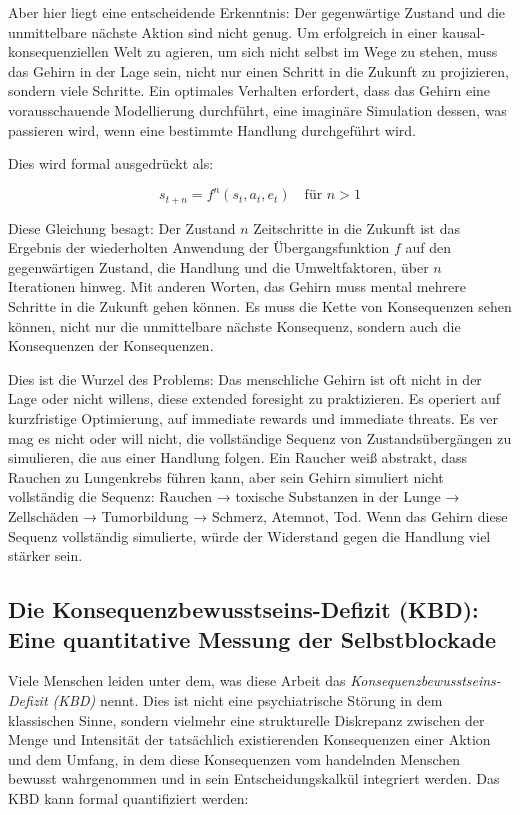 \documentclass[12pt,a4paper]{article}
\begin{document}
Aber hier liegt eine entscheidende Erkenntnis: Der gegenwärtige Zustand und die unmittelbare nächste Aktion sind nicht genug. Um erfolgreich in einer kausal-konsequenziellen Welt zu agieren, um sich nicht selbst im Wege zu stehen, muss das Gehirn in der Lage sein, nicht nur einen Schritt in die Zukunft zu projizieren, sondern viele Schritte. Ein optimales Verhalten erfordert, dass das Gehirn eine vorausschauende Modellierung durchführt, eine imaginäre Simulation dessen, was passieren wird, wenn eine bestimmte Handlung durchgeführt wird.

Dies wird formal ausgedrückt als:

\begin{equation}
s_{t+n} = f^n(s_t, a_t, e_t) \quad \text{für } n > 1
\end{equation}

Diese Gleichung besagt: Der Zustand $n$ Zeitschritte in die Zukunft ist das Ergebnis der wiederholten Anwendung der Übergangsfunktion $f$ auf den gegenwärtigen Zustand, die Handlung und die Umweltfaktoren, über $n$ Iterationen hinweg. Mit anderen Worten, das Gehirn muss mental mehrere Schritte in die Zukunft gehen können. Es muss die Kette von Konsequenzen sehen können, nicht nur die unmittelbare nächste Konsequenz, sondern auch die Konsequenzen der Konsequenzen.

Dies ist die Wurzel des Problems: Das menschliche Gehirn ist oft nicht in der Lage oder nicht willens, diese extended foresight zu praktizieren. Es operiert auf kurzfristige Optimierung, auf immediate rewards und immediate threats. Es ver mag es nicht oder will nicht, die vollständige Sequenz von Zustandsübergängen zu simulieren, die aus einer Handlung folgen. Ein Raucher weiß abstrakt, dass Rauchen zu Lungenkrebs führen kann, aber sein Gehirn simuliert nicht vollständig die Sequenz: Rauchen → toxische Substanzen in der Lunge → Zellschäden → Tumorbildung → Schmerz, Atemnot, Tod. Wenn das Gehirn diese Sequenz vollständig simulierte, würde der Widerstand gegen die Handlung viel stärker sein.

\subsection{Die Konsequenzbewusstseins-Defizit (KBD): Eine quantitative Messung der Selbstblockade}

Viele Menschen leiden unter dem, was diese Arbeit das \textit{Konsequenzbewusstseins-Defizit (KBD)} nennt. Dies ist nicht eine psychiatrische Störung in dem klassischen Sinne, sondern vielmehr eine strukturelle Diskrepanz zwischen der Menge und Intensität der tatsächlich existierenden Konsequenzen einer Aktion und dem Umfang, in dem diese Konsequenzen vom handelnden Menschen bewusst wahrgenommen und in sein Entscheidungskalkül integriert werden. Das KBD kann formal quantifiziert werden:
\end{document}
